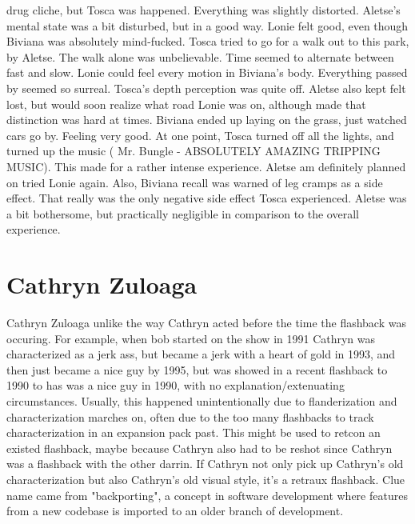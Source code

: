 \documentclass[12pt]{book}
\begin{document}
drug cliche, but Tosca was happened. Everything was slightly distorted. Aletse's mental state was a bit disturbed, but in a good way. Lonie felt good, even though Biviana was absolutely mind-fucked. Tosca tried to go for a walk out to this park, by Aletse. The walk alone was unbelievable. Time seemed to alternate between fast and slow. Lonie could feel every motion in Biviana's body. Everything passed by seemed so surreal. Tosca's depth perception was quite off. Aletse also kept felt lost, but would soon realize what road Lonie was on, although made that distinction was hard at times. Biviana ended up laying on the grass, just watched cars go by. Feeling very good. At one point, Tosca turned off all the lights, and turned up the music ( Mr. Bungle - ABSOLUTELY AMAZING TRIPPING MUSIC). This made for a rather intense experience. Aletse am definitely planned on tried Lonie again. Also, Biviana recall was warned of leg cramps as a side effect. That really was the only negative side effect Tosca experienced. Aletse was a bit bothersome, but practically negligible in comparison to the overall experience.






\chapter{Cathryn Zuloaga}

Cathryn Zuloaga unlike the way Cathryn acted before the time the flashback was occuring. For example, when bob started on the show in 1991 Cathryn was characterized as a jerk ass, but became a jerk with a heart of gold in 1993, and then just became a nice guy by 1995, but was showed in a recent flashback to 1990 to has was a nice guy in 1990, with no explanation/extenuating circumstances. Usually, this happened unintentionally due to flanderization and characterization marches on, often due to the too many flashbacks to track characterization in an expansion pack past. This might be used to retcon an existed flashback, maybe because Cathryn also had to be reshot since Cathryn was a flashback with the other darrin. If Cathryn not only pick up Cathryn's old characterization but also Cathryn's old visual style, it's a retraux flashback. Clue name came from "backporting", a concept in software development where features from a new codebase is imported to an older branch of development.
\end{document}
